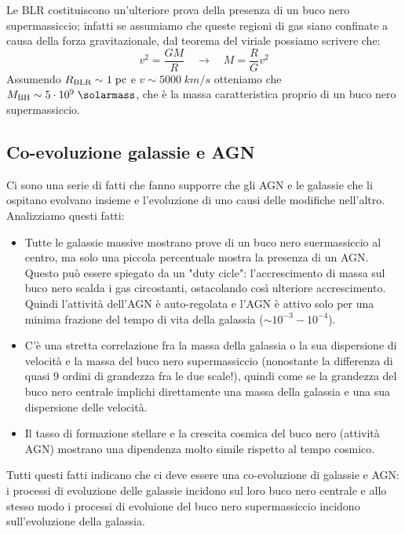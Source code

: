 Le BLR costituiscono un'ulteriore prova della presenza di un buco nero supermassiccio; infatti se assumiamo che queste regioni di gas siano confinate a causa della forza gravitazionale, dal teorema del viriale possiamo scrivere che:
\begin{equation*}
    v^2 = \frac{GM}{R} \quad \rightarrow \quad M = \frac{R}{G} v^2
\end{equation*}
Assumendo $R_\textup{BLR}\sim 1 \;\si{pc}$ e $v \sim 5000 \;\si{km}/\si{s}$ otteniamo che $M_\textup{BH} \sim 5 \cdot 10^9 \;\si{\solarmass}$, che è la massa caratteristica proprio di un buco nero supermassiccio.

\subsection{Co-evoluzione galassie e AGN} \label{co-evoluzione-galassie-agn}
Ci sono una serie di fatti che fanno supporre che gli AGN e le galassie che li ospitano evolvano insieme e l'evoluzione di uno causi delle modifiche nell'altro. Analizziamo questi fatti:
\begin{itemize}
    \item Tutte le galassie massive mostrano prove di un buco nero suermassiccio al centro, ma solo una piccola percentuale mostra la presenza di un AGN. Questo può essere spiegato da un "duty cicle": l'accrescimento di massa sul buco nero scalda i gas circostanti, ostacolando così ulteriore accrescimento. Quindi l'attività dell'AGN è auto-regolata e l'AGN è attivo solo per una minima frazione del tempo di vita della galassia ($\sim 10^{-3}-10^{-4}$).
    \item C'è una stretta correlazione fra la massa della galassia o la sua dispersione di velocità e la massa del buco nero supermassiccio (nonostante la differenza di quasi 9 ordini di grandezza fra le due scale!), quindi come se la grandezza del buco nero centrale implichi direttamente una massa della galassia e una sua dispersione delle velocità.
    \item Il tasso di formazione stellare e la crescita cosmica del buco nero (attività AGN) mostrano una dipendenza molto simile rispetto al tempo cosmico.
\end{itemize}

Tutti questi fatti indicano che ci deve essere una co-evoluzione di galassie e AGN: i processi di evoluzione delle galassie incidono sul loro buco nero centrale e allo stesso modo i processi di evoluione del buco nero supermassiccio incidono sull'evoluzione della galassia.

